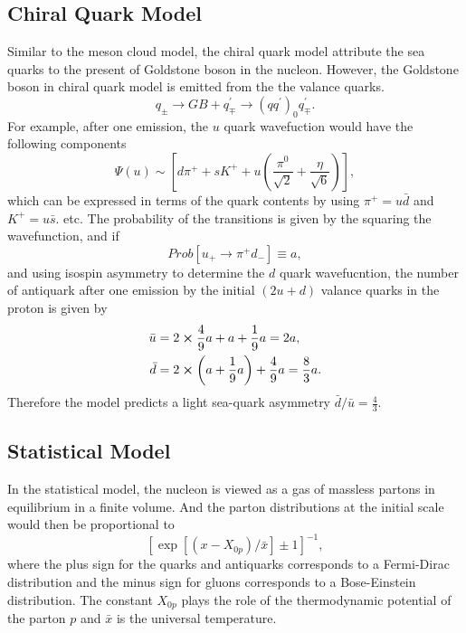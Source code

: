 \documentclass[../main.tex]{subfiles}
\begin{document}
\subsection{Chiral Quark Model}
Similar to the meson cloud model, the chiral quark model \cite{li1998} attribute the sea quarks to 
the present of Goldstone boson in the nucleon. However, the Goldstone boson in chiral quark model 
is emitted from the the valance quarks.
\begin{equation}
	q_{\pm} \rightarrow GB + q^\prime_\mp \rightarrow \left(q q^\prime\right)_0 q_{\mp}^\prime.
\end{equation}
For example, after one emission, the $u$ quark wavefuction would have the following components
\begin{equation}
	\Psi\left(u\right) \sim \left[d\pi^+ + s K^+ + u \left(\frac{\pi^0}{\sqrt{2}} + \frac{\eta}{\sqrt{6}}\right)\right],
\end{equation}
which can be expressed in terms of the quark contents by using $\pi^+ = u\bar{d}$ and $K^+ = u\bar{s}$. etc.
The probability of the transitions is given by the squaring the wavefunction, and if
\begin{equation}
	Prob\left[ u_+ \rightarrow \pi^+d_-\right] \equiv a,
\end{equation}
and using isospin asymmetry to determine the $d$ quark wavefucntion, the number of antiquark after one emission
by the initial $(2u+d)$ valance quarks in the proton is given by
\begin{equation}
	\begin{aligned}
		\bar{u} & = 2\cross\frac{4}{9}a +a+\frac{1}{9}a = 2a,                         \\
		\bar{d} & = 2\cross\left(a+\frac{1}{9}a\right) + \frac{4}{9}a = \frac{8}{3}a.
	\end{aligned}
\end{equation}
Therefore the model predicts a light sea-quark asymmetry $\bar{d}/\bar{u} =\frac{4}{3} $.

\subsection{Statistical Model}
In the statistical model\cite{bourrely2015}, the nucleon is viewed as a gas of massless partons in equilibrium in
a finite volume. And the parton distributions at the initial scale would then be proportional to
\begin{equation}
	\left[ \exp\left[\left(x-X_{0p}\right)/\bar{x}\right] \pm 1 \right]^{-1},
\end{equation}
where the plus sign for the quarks and antiquarks corresponds to a Fermi-Dirac distribution and
the minus sign for gluons corresponds to a Bose-Einstein distribution. The constant $X_{0p}$
plays the role of the thermodynamic potential of the parton $p$ and $\bar{x}$ is the universal
temperature.
\end{document}
